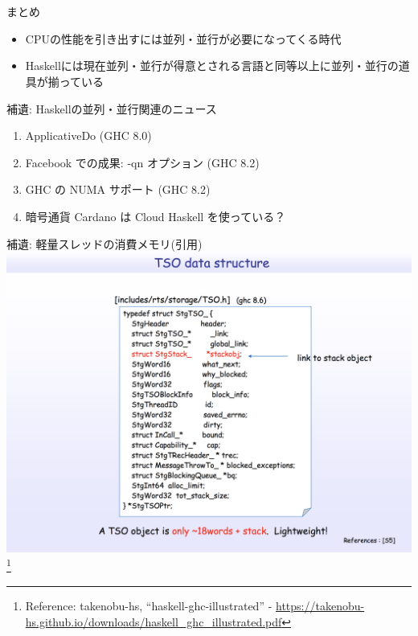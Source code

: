 \documentclass[unicode,12pt]{beamer}
\begin{document}
\section{}

\begin{frame}{まとめ}
  \begin{itemize}
  \item CPUの性能を引き出すには並列・並行が必要になってくる時代
  \item \alert{Haskellには現在並列・並行が得意とされる言語と同等以上に並列・並行の道具が揃っている}
  \end{itemize}
\end{frame}

\begin{frame}[plain]{補遺: Haskellの並列・並行関連のニュース}
  \begin{enumerate}
  \item ApplicativeDo (GHC 8.0)
  \item Facebook での成果: -qn オプション (GHC 8.2)
  \item GHC の NUMA サポート (GHC 8.2)
  \item 暗号通貨 Cardano は Cloud Haskell を使っている？
  \end{enumerate}
\end{frame}

\begin{frame}[plain]{補遺: 軽量スレッドの消費メモリ(引用)}
  \centering
  \includegraphics[width=.7\textwidth]{pic/tso.png}
  \footnote{Reference: takenobu-hs, ``haskell-ghc-illustrated'' - \url{https://takenobu-hs.github.io/downloads/haskell_ghc_illustrated.pdf}}
\end{frame}
\end{document}
